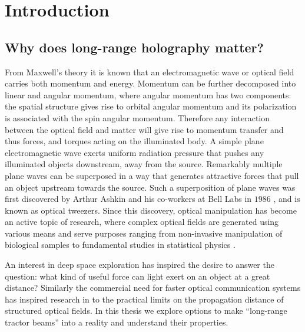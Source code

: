 \chapter{Introduction}
\label{ch:intro}



\section{Why does long-range holography matter?}

From Maxwell's theory it is known that an electromagnetic wave or optical field carries both momentum and energy. Momentum can be further decomposed into linear and angular momentum, where angular momentum has two components: the spatial structure gives rise to orbital angular momentum \cite{Yao2011} and its polarization is associated with the spin angular momentum. Therefore any interaction between the optical field and matter will give rise to momentum transfer and thus forces, and torques acting on the illuminated body. A simple plane electromagnetic wave exerts uniform radiation pressure that pushes any illuminated objects downstream, away from the source. Remarkably multiple plane waves can be superposed in a way that generates attractive forces that pull an object upstream towards the source. Such a superposition of plane waves was first discovered by Arthur Ashkin and his co-workers at Bell Labs in $1986$ \cite{beth1936}, and is known as optical tweezers. Since this discovery, optical manipulation has become an active topic of research, where complex optical fields are generated using various means and serve purposes ranging from non-invasive manipulation of biological samples to fundamental studies in statistical physics \cite{Volpe:09,Sanchez2019,Leibler1994}.


An interest in deep space exploration has inspired the desire to answer the question: what kind of useful force can light exert on an object at a great distance? Similarly the commercial need for faster optical communication systems has inspired research in to the practical limits on the propagation distance of structured optical fields. In this thesis we explore options to make ``long-range tractor beams'' into a reality and understand their properties.


